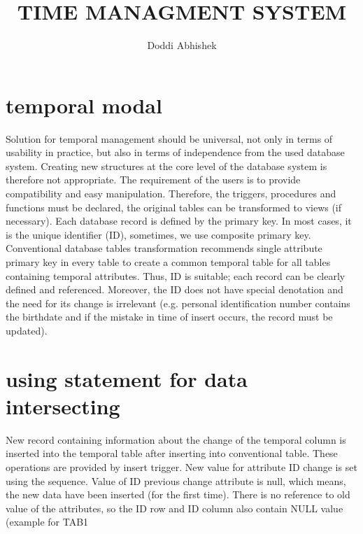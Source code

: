 \documentclass{article}
\title{TIME MANAGMENT SYSTEM}
\author{Doddi Abhishek}
\begin{document}
\maketitle







\section{temporal modal}
Solution for temporal management should be universal, not only in terms of usability in practice, but also in terms
of independence from the used database system. Creating new structures at the core level of the database system is
therefore not appropriate. The requirement of the users is to provide compatibility and easy manipulation. Therefore,
the triggers, procedures and functions must be declared, the original tables can be transformed to views (if necessary).
Each database record is defined by the primary key. In most cases, it is the unique identifier (ID), sometimes, we use
composite primary key. Conventional database tables transformation recommends single attribute primary key in every
table to create a common temporal table for all tables containing temporal attributes. Thus, ID is suitable; each record can be clearly defined and referenced. Moreover, the ID does not have special denotation and the need for its change
is irrelevant (e.g. personal identification number contains the birthdate and if the mistake in time of insert occurs, the
record must be updated).

\section{using statement for data intersecting}
New record containing information about the change of the temporal column is inserted into the temporal table after
inserting into conventional table. These operations are provided by insert trigger. New value for attribute ID change is set using the sequence. Value of ID previous change attribute is null, which means, the new data have been inserted
(for the first time). There is no reference to old value of the attributes, so the ID row and ID column also contain
NULL value (example for TAB1
\end{document}
